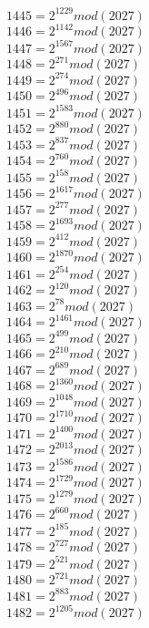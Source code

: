 \documentclass[12pt, letterpaper]{article}
\begin{document}
\begin{itemize}
\begin{multicols}{3}
$1445= 2^{1229} mod (2027)$\\
$1446= 2^{1142} mod (2027)$\\
$1447= 2^{1567} mod (2027)$\\
$1448= 2^{271} mod (2027)$\\
$1449= 2^{274} mod (2027)$\\
$1450= 2^{496} mod (2027)$\\
$1451= 2^{1583} mod (2027)$\\
$1452= 2^{880} mod (2027)$\\
$1453= 2^{837} mod (2027)$\\
$1454= 2^{760} mod (2027)$\\
$1455= 2^{158} mod (2027)$\\
$1456= 2^{1617} mod (2027)$\\
$1457= 2^{277} mod (2027)$\\
$1458= 2^{1693} mod (2027)$\\
$1459= 2^{412} mod (2027)$\\
$1460= 2^{1870} mod (2027)$\\
$1461= 2^{254} mod (2027)$\\
$1462= 2^{120} mod (2027)$\\
$1463= 2^{78} mod (2027)$\\
$1464= 2^{1461} mod (2027)$\\
$1465= 2^{499} mod (2027)$\\
$1466= 2^{210} mod (2027)$\\
$1467= 2^{689} mod (2027)$\\
$1468= 2^{1360} mod (2027)$\\
$1469= 2^{1048} mod (2027)$\\
$1470= 2^{1710} mod (2027)$\\
$1471= 2^{1400} mod (2027)$\\
$1472= 2^{2013} mod (2027)$\\
$1473= 2^{1586} mod (2027)$\\
$1474= 2^{1729} mod (2027)$\\
$1475= 2^{1279} mod (2027)$\\
$1476= 2^{660} mod (2027)$\\
$1477= 2^{185} mod (2027)$\\
$1478= 2^{727} mod (2027)$\\
$1479= 2^{521} mod (2027)$\\
$1480= 2^{721} mod (2027)$\\
$1481= 2^{883} mod (2027)$\\
$1482= 2^{1205} mod (2027)$\\

\end{multicols}
\end{itemize}
\end{document}
